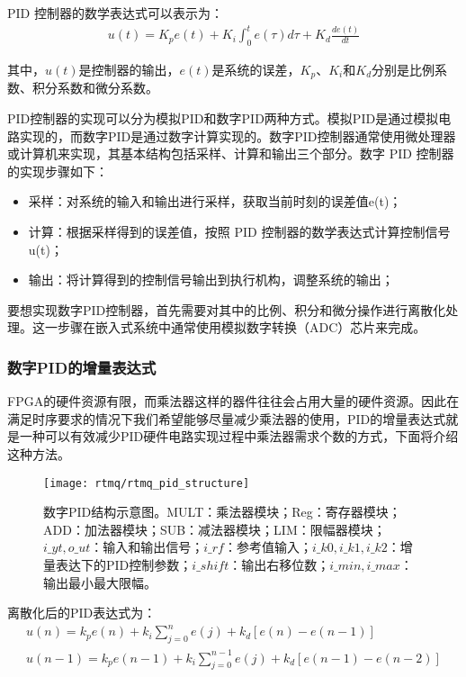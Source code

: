 PID 控制器的数学表达式可以表示为：
\begin{align}
    u(t)= K_p e(t) + K_i \int_{0}^{t} e(\tau) d\tau + K_d \frac{d e(t)}{dt}
\end{align}

其中，$u(t)$是控制器的输出，$e(t)$是系统的误差，$K_p$、$K_i$和$K_d$分别是比例系数、积分系数和微分系数。
 
PID控制器的实现可以分为模拟PID和数字PID两种方式。模拟PID是通过模拟电路实现的，而数字PID是通过数字计算实现的。数字PID控制器通常使用微处理器或计算机来实现，其基本结构包括采样、计算和输出三个部分。数字 PID 控制器的实现步骤如下：
\begin{itemize}
    \item 采样：对系统的输入和输出进行采样，获取当前时刻的误差值e(t)；
    \item 计算：根据采样得到的误差值，按照 PID 控制器的数学表达式计算控制信号u(t)；
    \item 输出：将计算得到的控制信号输出到执行机构，调整系统的输出；
\end{itemize}

要想实现数字PID控制器，首先需要对其中的比例、积分和微分操作进行离散化处理。这一步骤在嵌入式系统中通常使用模拟数字转换（ADC）芯片来完成。

\subsubsection[数字PID的增量表达式]{数字PID的增量表达式}
FPGA的硬件资源有限，而乘法器这样的器件往往会占用大量的硬件资源。因此在满足时序要求的情况下我们希望能够尽量减少乘法器的使用，PID的增量表达式就是一种可以有效减少PID硬件电路实现过程中乘法器需求个数的方式，下面将介绍这种方法。

\begin{figure}
    \centering
    \texttt{[image: rtmq/rtmq\_pid\_structure]}
    \caption[数字PID结构示意图]{数字PID结构示意图。MULT：乘法器模块；Reg：寄存器模块；ADD：加法器模块；SUB：减法器模块；LIM：限幅器模块；$i\_yt, o\_ut$：输入和输出信号；$i\_rf$：参考值输入；$i\_k0, i\_k1, i\_k2$：增量表达下的PID控制参数；$i\_shift$：输出右移位数；$i\_min, i\_max$：输出最小最大限幅。\label{fig:rtmq_pid_structure}}
\end{figure}

离散化后的PID表达式为：
\begin{align}
    u(n)=k_p e(n)+k_i\sum_{j=0}^{n}e(j)+k_d[e(n)-e(n-1)]\\
    u(n-1)=k_p e(n-1)+k_i \sum_{j=0}^{n-1}e(j)+k_d [e(n-1)-e(n-2)]
\end{align}

